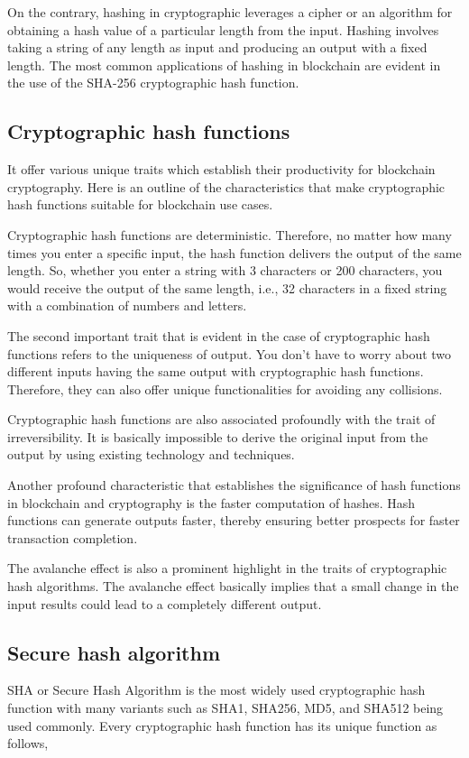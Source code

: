 \documentclass[BTech]{srmuthesis}
\begin{document}
  On the contrary, hashing in cryptographic leverages a cipher or an algorithm for obtaining a hash value of a particular length from the input. Hashing involves taking a string of any length as input and producing an output with a fixed length. The most common applications of hashing in blockchain are evident in the use of the SHA-256 cryptographic hash function.

  \subsection{Cryptographic hash functions}
  It offer various unique traits which establish their productivity for blockchain cryptography. Here is an outline of the characteristics that make cryptographic hash functions suitable for blockchain use cases.

  Cryptographic hash functions are deterministic. Therefore, no matter how many times you enter a specific input, the hash function delivers the output of the same length. So, whether you enter a string with 3 characters or 200 characters, you would receive the output of the same length, i.e., 32 characters in a fixed string with a combination of numbers and letters. 

  The second important trait that is evident in the case of cryptographic hash functions refers to the uniqueness of output. You don’t have to worry about two different inputs having the same output with cryptographic hash functions. Therefore, they can also offer unique functionalities for avoiding any collisions. 

  Cryptographic hash functions are also associated profoundly with the trait of irreversibility. It is basically impossible to derive the original input from the output by using existing technology and techniques. 

  Another profound characteristic that establishes the significance of hash functions in blockchain and cryptography is the faster computation of hashes. Hash functions can generate outputs faster, thereby ensuring better prospects for faster transaction completion. 

  The avalanche effect is also a prominent highlight in the traits of cryptographic hash algorithms. The avalanche effect basically implies that a small change in the input results could lead to a completely different output. 

  \subsection{Secure hash algorithm}
  SHA or Secure Hash Algorithm is the most widely used cryptographic hash function with many variants such as SHA1, SHA256, MD5, and SHA512 being used commonly. Every cryptographic hash function has its unique function as follows,
\end{document}
